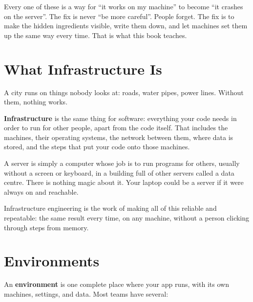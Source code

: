 Every one of these is a way for ``it works on my machine'' to become ``it crashes on the server''. The fix is never ``be more careful''. People forget. The fix is to make the hidden ingredients visible, write them down, and let machines set them up the same way every time. That is what this book teaches.

\section{What Infrastructure Is}\label{01-from-works-on-my-machine-to-works-for-everyone:what-infrastructure-is}

A city runs on things nobody looks at: roads, water pipes, power lines. Without them, nothing works.

\textbf{Infrastructure} is the same thing for software: everything your code needs in order to run for other people, apart from the code itself. That includes the machines, their operating systems, the network between them, where data is stored, and the steps that put your code onto those machines.

A server is simply a computer whose job is to run programs for others, usually without a screen or keyboard, in a building full of other servers called a data centre. There is nothing magic about it. Your laptop could be a server if it were always on and reachable.

Infrastructure engineering is the work of making all of this reliable and repeatable: the same result every time, on any machine, without a person clicking through steps from memory.


\section{Environments}\label{01-from-works-on-my-machine-to-works-for-everyone:environments}

An \textbf{environment} is one complete place where your app runs, with its own machines, settings, and data. Most teams have several:

